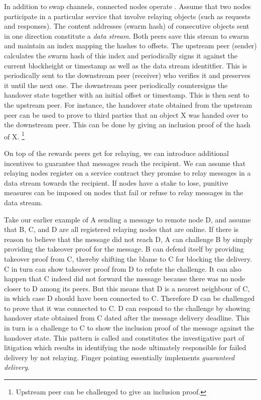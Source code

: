 In addition to swap channels, connected nodes operate .
Assume that two nodes participate in a particular service that involve
relaying objects (such as requests and responses).
The content addresses (swarm hash) of consecutive objects
sent in one direction constitute a \emph{data stream}.
Both peers save this stream to swarm and maintain an index mapping the hashes to offsets.
The upstream peer (sender) calculates the swarm hash of this index and periodically
signs it against the current blockheight or timestamp as well as the data stream identitfier.
This  is periodically sent to the downstream peer (receiver)
who verifies it and preserves it until the next one.
The downstream peer periodically countersigns the handover state together with an initial
offset or timestamp. This  is then sent to the upstream peer.
For instance, the handover state obtained from the upstream peer can be used to prove to third parties
that an object X was handed over to the downstream peer. This can be done by
giving an inclusion proof of the hash of X.%
%
\footnote{Upstream peer can be challenged to give an inclusion proof.}

On top of the rewards peers get for relaying, we can introduce additional
incentives to guarantee that messages reach the recipient.
We can assume that relaying nodes register on a service contract they promise to relay messages in a data stream
towards the recipient.
If nodes have a stake to lose, punitive measures can be imposed on nodes that fail or refuse to relay messages in the data stream.

Take our earlier example of A sending a message to remote node D, and assume that
B, C, and D are all registered relaying nodes that are online. If there is reason
to believe that the message did not reach D, A can challenge B by simply providing
the takeover proof for the message. B can defend itself by providing takeover proof from C,
thereby shifting the blame to C for blocking the delivery. C in turn can show takeover proof
from D to refute the challenge. It can also happen that C indeed did not forward the message
because there was no node closer to D among its peers. But this means that
D is a nearest neighbour of C, in which case D should have been connected to C.
Therefore D can be challenged to prove that it was connected to C. D can respond to the challenge
by showing handover state obtained from C dated after the message delivery deadline. This in turn is
a challenge to C to show the inclusion proof of the message against the handover state.
This pattern is called  and constitutes the investigative part
of litigation which results in identifying the node
ultimately responsible for failed delivery by not relaying.
Finger pointing essentially implements \emph{guaranteed delivery}.

